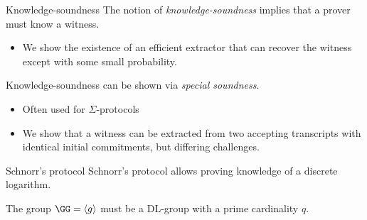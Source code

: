 \begin{frame}{Knowledge-soundness}
  The notion of \emph{knowledge-soundness} implies that a prover must know a witness.
  \begin{itemize}[<+(1)->]
    \item We show the existence of an efficient extractor that can recover the witness except with some small probability.
  \end{itemize}

  \vspace*{1em}

  \pause
  Knowledge-soundness can be shown via \emph{special soundness}.
  \begin{itemize}[<+(1)->]
    \item Often used for $\Sigma$-protocols
    \item We show that a witness can be extracted from two accepting transcripts with identical initial commitments, but differing challenges.
  \end{itemize}
\end{frame}

\begin{frame}{Schnorr's protocol}
  Schnorr's protocol allows proving knowledge of a discrete logarithm.
  \pause
  \begin{center}
  \end{center}

  The group $\GG = \langle g\rangle$ must be a DL-group with a prime cardinality $q$.
\end{frame}

